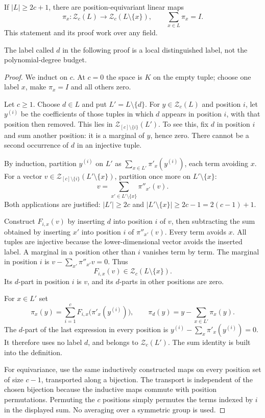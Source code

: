 \begin{lemma}\label{lem:unity}
If $|L|\ge2c+1$, there are position-equivariant linear maps
\[\pi_x:\mathcal Z_c(L)\longrightarrow \mathcal Z_c(L\setminus\{x\}),\qquad
\sum_{x\in L}\pi_x=I.
\]
This statement and its proof work over any field.
\end{lemma}
The label called $d$ in the following proof is a local distinguished
label, not the polynomial-degree budget.
\begin{proof}
We induct on $c$. At $c=0$ the space is $K$ on the empty tuple; choose one label $x$, make $\pi_x=I$ and all others zero.

Let $c\ge1$. Choose $d\in L$ and put $L'=L\setminus\{d\}$. For $y\in \mathcal Z_c(L)$ and position $i$, let $y^{(i)}$ be the coefficients of those tuples in which $d$ appears in position $i$, with that position then removed. This lies in $\mathcal Z_{[c]\setminus\{i\}}(L')$. To see this, fix $d$ in position $i$ and sum another position: it is a marginal of $y$, hence zero. There cannot be a second occurrence of $d$ in an injective tuple.

By induction, partition $y^{(i)}$ on $L'$ as $\sum_{x\in L'}\pi'_x(y^{(i)})$, each term avoiding $x$. For a vector $v\in \mathcal Z_{[c]\setminus\{i\}}(L'\setminus\{x\})$, partition once more on $L'\setminus\{x\}$:
\[v=\sum_{x'\in L'\setminus\{x\}}\pi''_{x'}(v).
\]
Both applications are justified: $|L'|\ge2c$ and $|L'\setminus\{x\}|\ge2c-1=2(c-1)+1$.

Construct $F_{i,x}(v)$ by inserting $d$ into position $i$ of $v$, then subtracting the sum obtained by inserting $x'$ into position $i$ of $\pi''_{x'}(v)$. Every term avoids $x$. All tuples are injective because the lower-dimensional vector avoids the inserted label. A marginal in a position other than $i$ vanishes term by term. The marginal in position $i$ is $v-\sum_{x'}\pi''_{x'}v=0$. Thus
\[F_{i,x}(v)\in \mathcal Z_c(L\setminus\{x\}).
\]
Its $d$-part in position $i$ is $v$, and its $d$-parts in other positions are zero.

For $x\in L'$ set
\[\pi_x(y)=\sum_{i=1}^cF_{i,x}\bigl(\pi'_x(y^{(i)})\bigr),\qquad
\pi_d(y)=y-\sum_{x\in L'}\pi_x(y).
\]
The $d$-part of the last expression in every position is $y^{(i)}-\sum_x\pi'_x(y^{(i)})=0$. It therefore uses no label $d$, and belongs to $\mathcal Z_c(L')$. The sum identity is built into the definition.

For equivariance, use the same inductively constructed maps on every position set of size $c-1$, transported along a bijection. The transport is independent of the chosen bijection because the inductive maps commute with position permutations. Permuting the $c$ positions simply permutes the terms indexed by $i$ in the displayed sum. No averaging over a symmetric group is used.
\end{proof}

